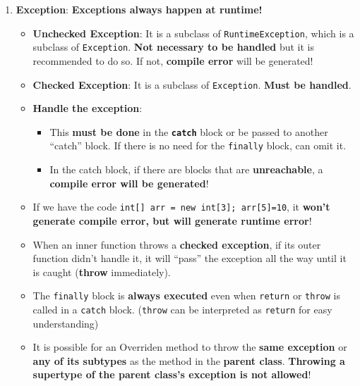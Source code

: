 \documentclass[10pt, landscape]{article}
\begin{document}
\begin{multicols}{4}
\begin{enumerate}
\begin{itemize}
    \end{itemize}
    \item \textbf{Exception}: \textbf{Exceptions always happen at runtime!}
    \begin{itemize}
        \item \textbf{Unchecked Exception}: It is a subclass of \texttt{RuntimeException}, which is a subclass of \texttt{Exception}. \textbf{Not necessary to be handled} but it is recommended to do so. If not, \textbf{compile error} will be generated!
        \item \textbf{Checked Exception}: It is a subclass of \texttt{Exception}. \textbf{Must be handled}. 
        \item \textbf{Handle the exception}:
        \begin{itemize}
            \item This \textbf{must be done} in the \texttt{\textbf{catch}} block or be passed to another ``catch'' block. If there is no need for the \texttt{finally} block, can omit it.
            \item In the catch block, if there are blocks that are \textbf{unreachable}, a \textbf{compile error will be generated}!
        \end{itemize}
        \item If we have the code \texttt{int[] arr = new int[3]; arr[5]=10}, it \textbf{won't generate compile error, but will generate runtime error}!
        \item When an inner function throws a \textbf{checked exception}, if its outer function didn't handle it, it will ``pass'' the exception all the way until it is caught (\textbf{throw} immediately).
        \item The \texttt{finally} block is \textbf{always executed} even when \texttt{return} or \texttt{throw} is called in a \texttt{catch} block. (\texttt{throw} can be interpreted as \texttt{return} for easy understanding)
        \item It is possible for an Overriden method to throw the \textbf{same exception} or \textbf{any of its subtypes} as the method in the\textbf{ parent class}. \textbf{Throwing a supertype of the parent class's exception is not allowed}!
    \end{itemize}
\end{enumerate}


\end{multicols}
\end{document}
